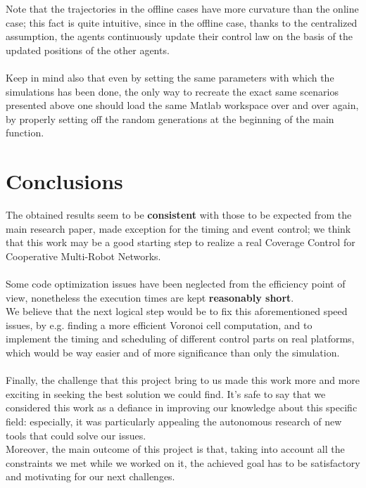 \documentclass[a4paper,11pt,oneside]{book}
\begin{document}
	Note that the trajectories in the offline cases have more curvature than the online case; this fact is quite intuitive, since in the offline case, thanks to the centralized assumption, the agents continuously update their control law on the basis of the updated positions of the other agents.\\\\
	
	Keep in mind also that even by setting the same parameters with which the simulations has been done, the only way to recreate the exact same scenarios presented above one should load the same Matlab workspace over and over again, by properly setting off the random generations at the beginning of the main function.
	
	
	\chapter*{Conclusions} %
	The obtained results seem to be \textbf{consistent} with those to be expected from the main research paper, made exception for the timing and event control; we think that this work may be a good starting step to realize a real Coverage Control for Cooperative Multi-Robot Networks.\\\\
	
	Some code optimization issues have been neglected from the efficiency point of view, nonetheless the execution times are kept \textbf{reasonably short}.\\
	We believe that the next logical step would be to fix this aforementioned speed issues, by e.g. finding a more efficient Voronoi cell computation, and to implement the timing and scheduling of different control parts on real platforms, which would be way easier and of more significance than only the simulation.\\\\
	
	Finally, the challenge that this project bring to us made this work more and more exciting in seeking the best solution we could find. It's safe to say that we considered this work as a defiance in improving our knowledge about this specific field: especially, it was particularly appealing the autonomous research of new tools that could solve our issues.\\
	Moreover, the main outcome of this project is that, taking into account all the constraints we met while we worked on it, the achieved goal has to be satisfactory and motivating for our next challenges.
	
\end{document}
